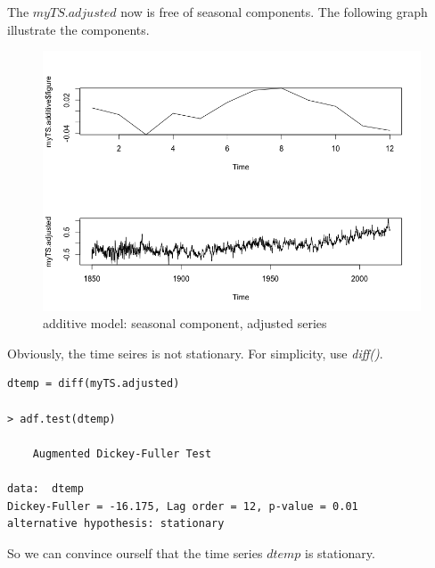 \documentclass[a4paper, 11pt]{article}
\begin{document}
\indent The $myTS.adjusted$ now is free of seasonal components. The following graph illustrate the components.
\begin{figure}[H]
\centering
\caption{additive model: seasonal component, adjusted series}
\includegraphics[scale=.50]{component.png}
\end{figure}
\indent Obviously, the time seires is not stationary. For simplicity, use \textit{diff()}.
\begin{verbatim}
dtemp = diff(myTS.adjusted)

> adf.test(dtemp)

	Augmented Dickey-Fuller Test

data:  dtemp
Dickey-Fuller = -16.175, Lag order = 12, p-value = 0.01
alternative hypothesis: stationary
\end{verbatim}
\indent So we can convince ourself that the time series $dtemp$ is stationary.
\end{document}
